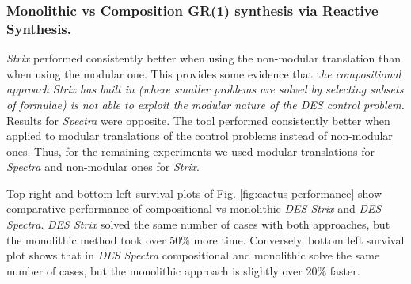 



\vspace{-0.5cm}
\subsubsection{
Monolithic vs Composition GR(1) synthesis via Reactive Synthesis.}

\textit{Strix} performed consistently better when using the non-modular translation than when using the modular one. This provides some evidence that t\textit{he compositional approach Strix has built in (where smaller problems are solved by selecting subsets of formulae) is not able to exploit the modular nature of the DES control problem. } Results for \textit{Spectra} were opposite. The tool performed consistently better when applied to modular translations of the control problems instead of non-modular ones. 
Thus, for the remaining experiments we used modular translations for \textit{Spectra} and non-modular ones for \textit{Strix}. 


 Top right and bottom left survival plots of Fig. \ref{fig:cactus-performance} show comparative performance of compositional vs monolithic \textit{DES Strix} and \textit{DES Spectra}. 
 \textit{DES Strix} solved the same number of cases with both approaches, but the monolithic method took over 50\% more time.
Conversely, bottom left survival plot shows that in \textit{DES Spectra} compositional and monolithic solve the same number of cases, but the monolithic approach is slightly over 20\% faster.

